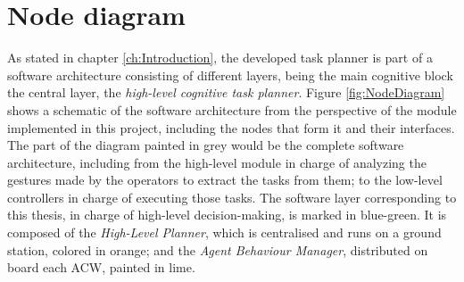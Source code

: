 \section{Node diagram}
\label{sec:NodeDiagram}
As stated in chapter \ref{ch:Introduction}, the developed task planner is part of a software architecture consisting of different layers, being the main cognitive block the central layer, the \emph{high-level cognitive task planner}. Figure \ref{fig:NodeDiagram} shows a schematic of the software architecture from the perspective of the module implemented in this project, including the nodes that form it and their interfaces. The part of the diagram painted in grey would be the complete software architecture, including from the high-level module in charge of analyzing the gestures made by the operators to extract the tasks from them; to the low-level controllers in charge of executing those tasks. The software layer corresponding to this thesis, in charge of high-level decision-making, is marked in blue-green. It is composed of the \emph{High-Level Planner}, which is centralised and runs on a ground station, colored in orange; and the \emph{Agent Behaviour Manager}, distributed on board each \gls{ACW}, painted in lime.

